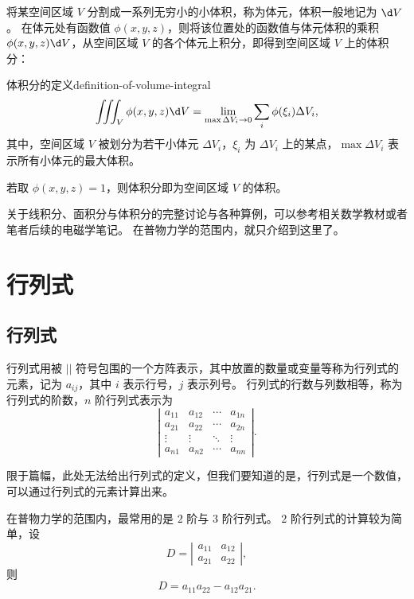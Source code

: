 \bigskip

将某空间区域 $ V $ 分割成一系列无穷小的小体积，称为体元，体积一般地记为 $ \d V $。
在体元处有函数值 $ \phi (x, y, z) $，则将该位置处的函数值与体元体积的乘积 $ \phi (x, y, z) \d V $，从空间区域 $ V $ 的各个体元上积分，即得到空间区域 $ V $ 上的体积分：
\begin{definition}{体积分的定义}{definition-of-volume-integral}
    \begin{equation}
        \iiint_V \phi (x, y, z) \d V = \lim_{\max \Delta V_i \to 0} \sum_{i} \phi (\xi_i) \Delta V_i ,
    \end{equation}
    其中，空间区域 $ V $ 被划分为若干小体元 $ \Delta V_i $，$ \xi_i $ 为 $ \Delta V_i $ 上的某点，$ \max \Delta V_i $ 表示所有小体元的最大体积。
\end{definition}

若取 $ \phi (x, y, z) = 1 $，则体积分即为空间区域 $ V $ 的体积。

关于线积分、面积分与体积分的完整讨论与各种算例，可以参考相关数学教材或者笔者后续的电磁学笔记。
在普物力学的范围内，就只介绍到这里了。

\section{行列式}\label{sec:determinant}

\subsection{行列式}\label{subsec:determinant}
行列式用被 $ || $ 符号包围的一个方阵表示，其中放置的数量或变量等称为行列式的元素，记为 $ a_{ij} $，其中 $ i $ 表示行号，$ j $ 表示列号。
行列式的行数与列数相等，称为行列式的阶数，$ n $ 阶行列式表示为
\begin{equation}
    \left| \begin{array}{cccc}
        a_{11} & a_{12} & \cdots & a_{1n} \\
        a_{21} & a_{22} & \cdots & a_{2n} \\
        \vdots & \vdots & \ddots & \vdots \\
        a_{n1} & a_{n2} & \cdots & a_{nn}
    \end{array} \right| .
\end{equation}

限于篇幅，此处无法给出行列式的定义，但我们要知道的是，行列式是一个数值，可以通过行列式的元素计算出来。

在普物力学的范围内，最常用的是 $ 2 $ 阶与 $ 3 $ 阶行列式。
$ 2 $ 阶行列式的计算较为简单，设
\begin{equation}
    D = \left| \begin{array}{cc}
        a_{11} & a_{12} \\
        a_{21} & a_{22}
    \end{array} \right| ,
\end{equation}
则
\begin{equation}
    D = a_{11} a_{22} - a_{12} a_{21} .
\end{equation}


